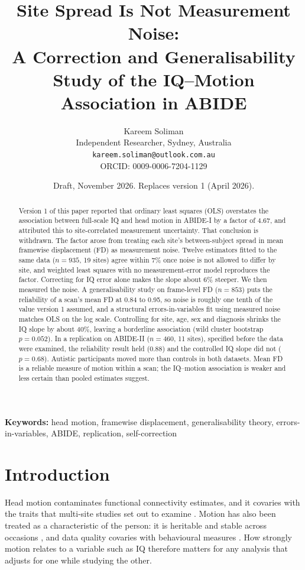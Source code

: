 \documentclass[11pt,a4paper]{article}
\title{Site Spread Is Not Measurement Noise:\\A Correction and Generalisability Study of the IQ--Motion Association in ABIDE}
\author{Kareem Soliman\\
  Independent Researcher, Sydney, Australia\\
  \texttt{kareem.soliman@outlook.com.au}\\
  ORCID: 0009-0006-7204-1129
}
\date{Draft, November 2026. Replaces version 1 (April 2026).}
\begin{document}
\maketitle

\begin{abstract}
Version 1 of this paper reported that ordinary least squares (OLS) overstates the association between full-scale IQ and head motion in ABIDE-I by a factor of 4.67, and attributed this to site-correlated measurement uncertainty. That conclusion is withdrawn. The factor arose from treating each site's between-subject spread in mean framewise displacement (FD) as measurement noise. Twelve estimators fitted to the same data ($n = 935$, 19 sites) agree within 7\% once noise is not allowed to differ by site, and weighted least squares with no measurement-error model reproduces the factor. Correcting for IQ error alone makes the slope about 6\% steeper. We then measured the noise. A generalisability study on frame-level FD ($n = 853$) puts the reliability of a scan's mean FD at 0.84 to 0.95, so noise is roughly one tenth of the value version 1 assumed, and a structural errors-in-variables fit using measured noise matches OLS on the log scale. Controlling for site, age, sex and diagnosis shrinks the IQ slope by about 40\%, leaving a borderline association (wild cluster bootstrap $p = 0.052$). In a replication on ABIDE-II ($n = 460$, 11 sites), specified before the data were examined, the reliability result held (0.88) and the controlled IQ slope did not ($p = 0.68$). Autistic participants moved more than controls in both datasets. Mean FD is a reliable measure of motion within a scan; the IQ--motion association is weaker and less certain than pooled estimates suggest.
\end{abstract}

\textbf{Keywords:} head motion, framewise displacement, generalisability theory, errors-in-variables, ABIDE, replication, self-correction

\section{Introduction}

Head motion contaminates functional connectivity estimates, and it covaries with the traits that multi-site studies set out to examine \citep{Power2012, VanDijk2012, Satterthwaite2012}. Motion has also been treated as a characteristic of the person: it is heritable and stable across occasions \citep{CouvyDuchesne2014, Engelhardt2017, Zeng2014}, and data quality covaries with behavioural measures \citep{Siegel2017}. How strongly motion relates to a variable such as IQ therefore matters for any analysis that adjusts for one while studying the other.
\end{document}

